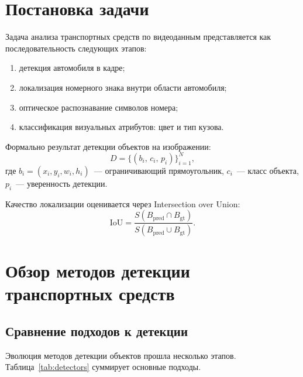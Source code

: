 \documentclass[14pt,a4paper]{report}
\numberwithin{equation}{chapter}
\numberwithin{figure}{chapter}
\numberwithin{table}{chapter}
\begin{document}
\section{Постановка задачи}

Задача анализа транспортных средств по видеоданным представляется как
последовательность следующих этапов:

\begin{enumerate}[nosep]
  \item детекция автомобиля в кадре;
  \item локализация номерного знака внутри области автомобиля;
  \item оптическое распознавание символов номера;
  \item классификация визуальных атрибутов: цвет и тип кузова.
\end{enumerate}

Формально результат детекции объектов на изображении:
\begin{equation}
  D = \bigl\{(b_i,\, c_i,\, p_i)\bigr\}_{i=1}^{N},
\end{equation}
где $b_i = (x_i, y_i, w_i, h_i)$~--- ограничивающий прямоугольник,
$c_i$~--- класс объекта, $p_i$~--- уверенность детекции.

Качество локализации оценивается через Intersection over Union:
\begin{equation}
  \mathrm{IoU} = \frac{S(B_{\mathrm{pred}} \cap B_{\mathrm{gt}})}
                      {S(B_{\mathrm{pred}} \cup B_{\mathrm{gt}})}.
\end{equation}

\section{Обзор методов детекции транспортных средств}

\subsection{Сравнение подходов к детекции}

Эволюция методов детекции объектов прошла несколько этапов.
Таблица~\ref{tab:detectors} суммирует основные подходы.
\end{document}

